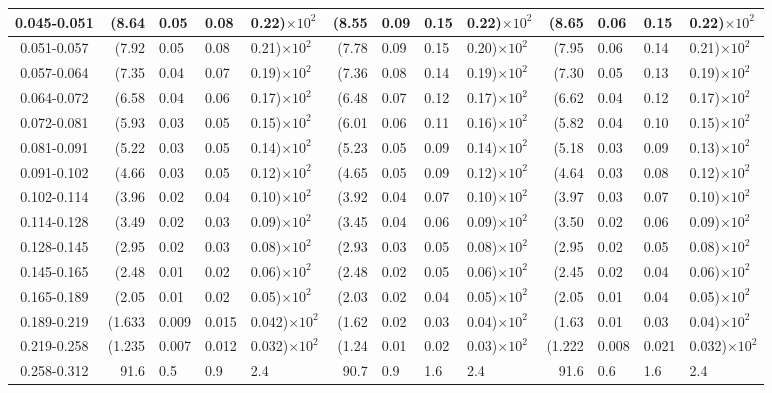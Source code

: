 \begin{table}[!htbp]
{\begin{tabular}{ | c | r@{$\pm$}l@{$\pm$}l@{$\pm$}l | r@{$\pm$}l@{$\pm$}l@{$\pm$}l | r@{$\pm$}l@{$\pm$}l@{$\pm$}l |}
0.045-0.051 & (8.64&0.05&0.08&0.22)$\times 10^{2}$ & (8.55&0.09&0.15&0.22)$\times 10^{2}$ & (8.65&0.06&0.15&0.22)$\times 10^{2}$ \\ \hline
0.051-0.057 & (7.92&0.05&0.08&0.21)$\times 10^{2}$ & (7.78&0.09&0.15&0.20)$\times 10^{2}$ & (7.95&0.06&0.14&0.21)$\times 10^{2}$ \\ \hline
0.057-0.064 & (7.35&0.04&0.07&0.19)$\times 10^{2}$ & (7.36&0.08&0.14&0.19)$\times 10^{2}$ & (7.30&0.05&0.13&0.19)$\times 10^{2}$ \\ \hline
0.064-0.072 & (6.58&0.04&0.06&0.17)$\times 10^{2}$ & (6.48&0.07&0.12&0.17)$\times 10^{2}$ & (6.62&0.04&0.12&0.17)$\times 10^{2}$ \\ \hline
0.072-0.081 & (5.93&0.03&0.05&0.15)$\times 10^{2}$ & (6.01&0.06&0.11&0.16)$\times 10^{2}$ & (5.82&0.04&0.10&0.15)$\times 10^{2}$ \\ \hline
0.081-0.091 & (5.22&0.03&0.05&0.14)$\times 10^{2}$ & (5.23&0.05&0.09&0.14)$\times 10^{2}$ & (5.18&0.03&0.09&0.13)$\times 10^{2}$ \\ \hline
0.091-0.102 & (4.66&0.03&0.05&0.12)$\times 10^{2}$ & (4.65&0.05&0.09&0.12)$\times 10^{2}$ & (4.64&0.03&0.08&0.12)$\times 10^{2}$ \\ \hline
0.102-0.114 & (3.96&0.02&0.04&0.10)$\times 10^{2}$ & (3.92&0.04&0.07&0.10)$\times 10^{2}$ & (3.97&0.03&0.07&0.10)$\times 10^{2}$ \\ \hline
0.114-0.128 & (3.49&0.02&0.03&0.09)$\times 10^{2}$ & (3.45&0.04&0.06&0.09)$\times 10^{2}$ & (3.50&0.02&0.06&0.09)$\times 10^{2}$ \\ \hline
0.128-0.145 & (2.95&0.02&0.03&0.08)$\times 10^{2}$ & (2.93&0.03&0.05&0.08)$\times 10^{2}$ & (2.95&0.02&0.05&0.08)$\times 10^{2}$ \\ \hline
0.145-0.165 & (2.48&0.01&0.02&0.06)$\times 10^{2}$ & (2.48&0.02&0.05&0.06)$\times 10^{2}$ & (2.45&0.02&0.04&0.06)$\times 10^{2}$ \\ \hline
0.165-0.189 & (2.05&0.01&0.02&0.05)$\times 10^{2}$ & (2.03&0.02&0.04&0.05)$\times 10^{2}$ & (2.05&0.01&0.04&0.05)$\times 10^{2}$ \\ \hline
0.189-0.219 & (1.633&0.009&0.015&0.042)$\times 10^{2}$ & (1.62&0.02&0.03&0.04)$\times 10^{2}$ & (1.63&0.01&0.03&0.04)$\times 10^{2}$ \\ \hline
0.219-0.258 & (1.235&0.007&0.012&0.032)$\times 10^{2}$ & (1.24&0.01&0.02&0.03)$\times 10^{2}$ & (1.222&0.008&0.021&0.032)$\times 10^{2}$ \\ \hline
0.258-0.312 & 91.6&0.5&0.9&2.4 & 90.7&0.9&1.6&2.4 & 91.6&0.6&1.6&2.4 \\ \hline

\end{tabular}}
\end{table}
